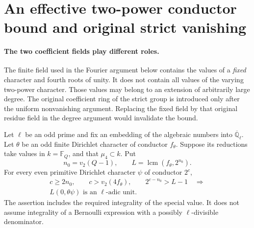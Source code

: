 \section{An effective two-power conductor bound and original strict vanishing}
\label{sec:effective-two-power-strict}

\paragraph{The two coefficient fields play different roles.}
The finite field used in the Fourier argument below contains the values
of a \emph{fixed} character and fourth roots of unity.  It does not contain
all values of the varying two-power character.  Those values may belong
to an extension of arbitrarily large degree.  The original coefficient
ring of the strict group is introduced only after the uniform
nonvanishing argument.  Replacing the fixed field by that original
residue field in the degree argument would invalidate the bound.

\begin{theorem}
\label{G173-effective-two-power-nonvanishing}
Let $\ell$ be an odd prime and fix an embedding of the algebraic numbers into
$\overline{\mathbb Q}_\ell$.  Let $\theta$ be an odd finite Dirichlet
character of conductor $f_\theta$.  Suppose its reductions take values
in $k=\mathbb F_Q$, and that $\mu_4\subset k$.  Put
\[
 n_0=v_2(Q-1),\qquad L=\operatorname{lcm}(f_\theta,2^{n_0}).
 \tag{G173.1}
\]
For every even primitive Dirichlet character $\psi$ of conductor $2^c$,
\[
 \begin{gathered}
 c\geq2n_0,\qquad c>v_2(4f_\theta),\qquad
                       2^{c-n_0}>L-1\quad\Longrightarrow\\
                     L(0,\theta\psi)\text{ is an }\ell\text{-adic unit}.
 \end{gathered}
 \tag{G173.2}
\]
The assertion includes the required integrality of the special value.
It does not assume integrality of a Bernoulli expression with a
possibly $\ell$-divisible denominator.
\end{theorem}

